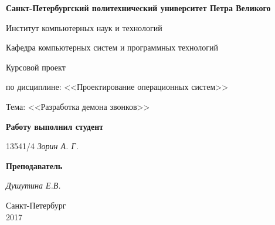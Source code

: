 \begin{titlepage}
\begin{center}

\textbf{Санкт-Петербургский политехнический университет Петра Великого}

\vspace{5mm}
Институт компьютерных наук и технологий

\vspace{5mm}
Кафедра компьютерных систем и программных технологий

\vspace*{\fill}

\huge{Курсовой проект}


\large{по дисциплине: <<Проектирование операционных систем>>}

\vspace*{2mm}
\large{Тема: <<Разработка демона звонков>>}

\vspace*{\fill}
\end{center}

\begin{large}
\hspace{0.4\linewidth} \textbf{Работу выполнил студент}

\vspace{5mm}
\hspace{0.4\linewidth} 13541/4 \hspace{1cm} \textit{Зорин А. Г.}

\vspace{3mm}
\hspace{0.4\linewidth} \textbf{Преподаватель}

\vspace{5mm}
\hspace{0.4\linewidth} \underline{\hspace{2cm} } \hspace{3mm} \textit{Душутина Е.В.}
\end{large}

\vspace*{3cm}

\begin{center}
\normalsize Санкт-Петербург\\2017
\end{center}
\end{titlepage}
